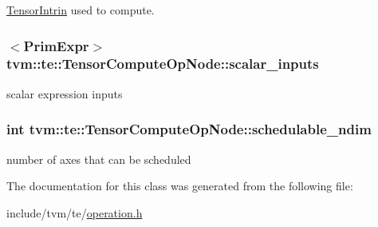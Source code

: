 \hyperlink{classtvm_1_1te_1_1TensorIntrin}{Tensor\+Intrin} used to compute. 

\subsubsection[{\texorpdfstring{scalar\+\_\+inputs}{scalar_inputs}}]{$<${\bf Prim\+Expr}$>$ tvm\+::te\+::\+Tensor\+Compute\+Op\+Node\+::scalar\+\_\+inputs}\hypertarget{classtvm_1_1te_1_1TensorComputeOpNode_ae96efdee192da92765d2a64aff1f9999}{}\label{classtvm_1_1te_1_1TensorComputeOpNode_ae96efdee192da92765d2a64aff1f9999}


scalar expression inputs 

\subsubsection[{\texorpdfstring{schedulable\+\_\+ndim}{schedulable_ndim}}]{\setlength{\rightskip}{0pt plus 5cm}int tvm\+::te\+::\+Tensor\+Compute\+Op\+Node\+::schedulable\+\_\+ndim}\hypertarget{classtvm_1_1te_1_1TensorComputeOpNode_af9fbd1dbdccbfbef35a87137b6a1bee6}{}\label{classtvm_1_1te_1_1TensorComputeOpNode_af9fbd1dbdccbfbef35a87137b6a1bee6}


number of axes that can be scheduled 



The documentation for this class was generated from the following file\+:\begin{DoxyCompactItemize}
\item 
include/tvm/te/\hyperlink{operation_8h}{operation.\+h}\end{DoxyCompactItemize}
